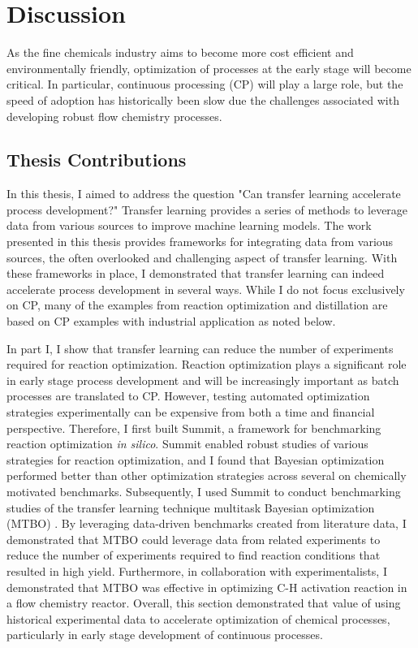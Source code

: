 \chapter{Discussion}\label{ch:discussion} 

As the fine chemicals industry aims to become more cost efficient and environmentally friendly, optimization of processes at the early stage will become critical. In particular, continuous processing (CP) will play a large role, but the speed of adoption has historically been slow due the challenges associated with developing robust flow chemistry processes.

\section{Thesis Contributions}

In this thesis, I aimed to address the question "Can transfer learning accelerate process development?"  Transfer learning provides a series of methods to leverage data from various sources to improve machine learning models. The work presented in this thesis provides frameworks for integrating data from various sources, the often overlooked and challenging aspect of transfer learning. With these frameworks in place, I demonstrated that transfer learning can indeed accelerate process development in several ways. While I do not focus exclusively on CP, many of the examples from reaction optimization and distillation are based on CP examples with industrial application as noted below.

In part I, I show that transfer learning can reduce the number of experiments required for reaction optimization. Reaction optimization plays a significant role in early stage process development and will be increasingly important as batch processes are translated to CP. However, testing automated optimization strategies experimentally can be expensive from both a time and financial perspective.  Therefore, I first built Summit, a framework for benchmarking reaction optimization \textit{in silico}. Summit enabled robust studies of various strategies for reaction optimization, and I found that Bayesian optimization performed better than other optimization strategies across several on chemically motivated benchmarks. Subsequently, I used Summit to conduct benchmarking studies of the transfer learning technique multitask Bayesian optimization (MTBO) \cite{Swersky2013}. By leveraging data-driven benchmarks created from literature data, I demonstrated that MTBO could leverage data from related experiments to reduce the number of experiments required to find reaction conditions that resulted in high yield. Furthermore, in collaboration with experimentalists, I demonstrated that MTBO was effective in optimizing C-H activation reaction in a flow chemistry reactor.  Overall, this section demonstrated that value of using historical experimental data to accelerate optimization of chemical processes, particularly in early stage development of continuous processes. 

